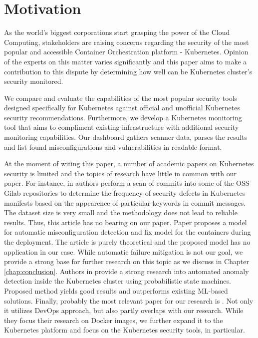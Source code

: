 \chapter*{Motivation}

As the world's biggest corporations start grasping the power of the Cloud Computing, stakeholders are raising concerns regarding the security of the most popular and accessible Container Orchestration platform - Kubernetes. Opinion of the experts on this matter varies significantly and this paper aims to make a contribution to this dispute by determining how well can be Kubernetes cluster's security monitored.

We compare and evaluate the capabilities of the most popular security tools designed specifically for Kubernetes against official and unofficial Kubernetes security recommendations. Furthermore, we develop a Kubernetes monitoring tool that aims to compliment existing infrastructure with additional security monitoring capabilities. Our dashboard gathers scanner data, parses the results and list found misconfigurations and vulnerabilities in readable format.

At the moment of witing this paper, a number of academic papers on Kubernetes security is limited and the topics of research have little in common with our paper. For instance, in \cite{defects} authors perform a scan of commits into some of the OSS Gilab repositories to determine the frequency of security defects in Kubernetes manifests based on the appearence of particular keywords in commit messages. The dataset size is very small and the methodology does not lead to reliable results. Thus, this article has no bearing on our paper. Paper \cite{detection} proposes a model for automatic misconfiguration detection and fix model for the containers during the deployment. The article is purely theoretical and the proposed model has no application in our case. While automatic failure mitigation is not our goal, we provide a strong base for further research on this topic as we discuss in Chapter \ref{chap:conclusion}. Authors in \cite{machines} provide a strong research into automated anomaly detection inside the Kubernetes cluster using probabilistic state machines. Proposed method yields good results and outperforms existing ML-based solutions. Finally, probably the most relevant paper for our research is \cite{evaluation}. Not only it utilizes DevOps approach, but also partly overlaps with our research. While they focus their research on Docker images, we further expand it to the Kubernetes platform and focus on the Kubernetes security tools, in particular.
